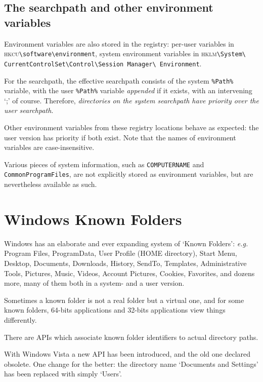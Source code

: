 \documentclass[11pt,a4paper,oneside]{report}
\let\bsl\textbackslash
\def\bslb{\bsl\discretionary{}{}{}}
\def\hkcu{\textsc{hkcu}}
\def\hklm{\textsc{hklm}}
\begin{document}
\subsection{The searchpath and other environment variables}
\label{sec:env}

Environment variables are also stored in the registry: per-user
variables in \hkcu\texttt{\bslb software\bslb environment}, system
environment variables in \hklm\texttt{\bslb System\bslb
  CurrentControlSet\bslb Control\bslb Session Manager\bslb
  Environment}.

For the searchpath, the effective searchpath consists of the system
\texttt{\%Path\%} variable, with the user \texttt{\%Path\%} variable
\emph{appended} if it exists, with an intervening `;' of
course. Therefore, \emph{directories on the system searchpath have
  priority over the user searchpath}.

Other environment variables from these registry locations behave as
expected: the user version has priority if both exist. Note that the
names of environment variables are case-insensitive.

{\sloppy
Various pieces of system information, such as \texttt{COMPUTERNAME}
and \texttt{CommonProgramFiles}, are not explicitly stored as
environment variables, but are nevertheless available as such.\par}

\section{ Windows Known Folders}
\label{sec:known}

Windows has an elaborate and ever expanding system of `Known
Folders': \emph{e.g.}  Program Files, ProgramData, User Profile
(HOME directory), Start Menu, Desktop, Documents, Downloads,
History, SendTo, Templates, Administrative Tools, Pictures, Music,
Videos, Account Pictures, Cookies, Favorites, and dozens more, many
of them both in a system- and a user version.

Sometimes a known folder is not a real folder but a virtual one, and
for some known folders, 64-bits applications and 32-bits
applications view things differently.

There are APIs which associate known folder identifiers to actual
directory paths.

With Windows Vista a new API has been introduced, and the old one
declared obsolete. One change for the better: the directory
name `Documents and Settings' has been replaced with simply `Users'.
\end{document}
